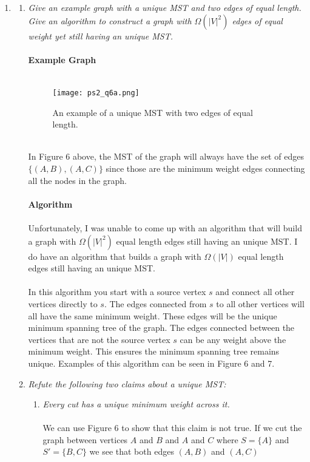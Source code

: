 \documentclass[12pt]{article}
\begin{document}
\begin{enumerate}
		\newpage
		\item
			\begin{enumerate}
				\item \textit{Give an example graph with a unique MST and two edges of equal length.  Give an algorithm to construct a graph with $\Omega{(|V|^2)}$
				edges of equal weight yet still having an unique MST.}\\
				\\
				\textbf{Example Graph}\\
				\\
				\begin{figure}[h]
				\caption{An example of a unique MST with two edges of equal length.}
				\texttt{[image: ps2\_q6a.png]}
				\centering
				\end{figure}
				\\
				In Figure 6 above, the MST of the graph will always have the set of edges $\{(A,B),(A,C)\}$ since those are the minimum weight edges connecting all the nodes in the graph.\\
				\\
				\textbf{Algorithm}\\
				\\
				Unfortunately, I was unable to come up with an algorithm that will build a graph with $\Omega{(|V|^2)}$ equal length edges still having an unique MST. 
				I do have an algorithm that builds a graph with $\Omega{(|V|)}$ equal length edges still having an unique MST.\\
				\\
				In this algorithm you start with a source vertex $s$ and connect all other vertices directly to $s$.  The edges connected from $s$ to all other vertices will all have the same minimum weight.
				These edges will be the unique minimum spanning tree of the graph.
				The edges connected between the vertices that are not the source vertex $s$ can be any weight above the minimum weight.  This ensures the minimum spanning tree remains unique.
				Examples of this algorithm can be seen in Figure 6 and 7.
				\\
				\item \textit{Refute the following two claims about a unique MST:}
					\begin{enumerate}
						\item \textit{Every cut has a unique minimum weight across it.}\\
						\\
						We can use Figure 6 to show that this claim is not true.  
						If we cut the graph between vertices $A$ and $B$ and $A$ and $C$ where $S = \{A\}$ and $S' =\{B,C\}$ we see that both edges $(A,B)$ and $(A,C)$

\end{enumerate}
\end{enumerate}
\end{enumerate}
\end{document}
